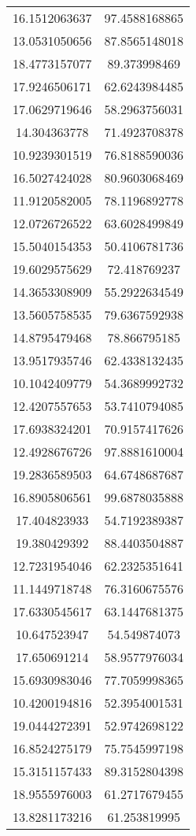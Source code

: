 \begin{table}
\begin{tabular}{cc}
16.1512063637 & 97.4588168865 \\
13.0531050656 & 87.8565148018 \\
18.4773157077 & 89.373998469 \\
17.9246506171 & 62.6243984485 \\
17.0629719646 & 58.2963756031 \\
14.304363778 & 71.4923708378 \\
10.9239301519 & 76.8188590036 \\
16.5027424028 & 80.9603068469 \\
11.9120582005 & 78.1196892778 \\
12.0726726522 & 63.6028499849 \\
15.5040154353 & 50.4106781736 \\
19.6029575629 & 72.418769237 \\
14.3653308909 & 55.2922634549 \\
13.5605758535 & 79.6367592938 \\
14.8795479468 & 78.866795185 \\
13.9517935746 & 62.4338132435 \\
10.1042409779 & 54.3689992732 \\
12.4207557653 & 53.7410794085 \\
17.6938324201 & 70.9157417626 \\
12.4928676726 & 97.8881610004 \\
19.2836589503 & 64.6748687687 \\
16.8905806561 & 99.6878035888 \\
17.404823933 & 54.7192389387 \\
19.380429392 & 88.4403504887 \\
12.7231954046 & 62.2325351641 \\
11.1449718748 & 76.3160675576 \\
17.6330545617 & 63.1447681375 \\
10.647523947 & 54.549874073 \\
17.650691214 & 58.9577976034 \\
15.6930983046 & 77.7059998365 \\
10.4200194816 & 52.3954001531 \\
19.0444272391 & 52.9742698122 \\
16.8524275179 & 75.7545997198 \\
15.3151157433 & 89.3152804398 \\
18.9555976003 & 61.2717679455 \\
13.8281173216 & 61.253819995 \\

\end{tabular}
\end{table}
